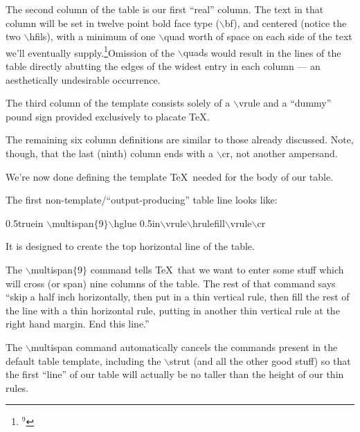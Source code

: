 \bigskip\par\noindent
The second column of the table 
is our first ``real'' column. The text in that column will 
be set in twelve point bold face type ({\twltt $\backslash$bf}), 
and centered (notice the two {\twltt $\backslash$hfil}s), with a 
minimum of one {\twltt $\backslash$quad} worth of space on each side 
of the text we'll eventually supply.\footnote{$^{9}$}{Omission
of the {\twltt $\backslash$quad}s would result in the lines of the table 
directly abutting the edges of the widest entry in each column --- an 
aesthetically undesirable occurrence.}
\bigskip\par\noindent
The third column of the template consists solely of a 
{\twltt $\backslash$vrule}
and a ``dummy'' pound sign provided exclusively to placate \TeX{}.
\bigskip\par\noindent
The remaining six column definitions are similar to those already discussed.
Note, though, that the last (ninth) column ends with a {\twltt $\backslash$cr},
not another ampersand. 
\bigskip\par\noindent
We're now done defining the template \TeX\ needed for the body of our table.
\bigskip\bigskip\par\noindent
{}
\bigskip\par\noindent
The first non-template/``output-producing'' table line looks like:
\bigskip\par\noindent\hglue 0.5truein
{\twltt $\backslash$multispan$\{$9$\}${}$\backslash$hglue 0.5in$\backslash$vrule$\backslash$hrulefill$\backslash$vrule$\backslash$cr}
\bigskip\par\noindent
It is designed to create the top horizontal line of the table.
\bigskip\par\noindent
The {\twltt $\backslash$multispan$\{$9$\}$} command tells \TeX\ that we
want to enter some stuff which will cross (or span) nine columns of the table.
The rest of that command says ``skip a half inch horizontally, then 
put in a thin vertical rule, then fill the rest of the line with a thin horizontal
rule, putting in another thin vertical rule at the right hand margin. 
End this line.'' 
\bigskip\par\noindent
The {\twltt $\backslash$multispan} command automatically
cancels the commands present in the default table template, including 
the {\twltt $\backslash$strut} (and all the other good stuff) so that 
the first  ``line'' of our table will actually be no taller than
the height of our thin rules. 
\bigskip\par\noindent
